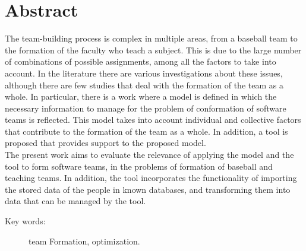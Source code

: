 
\section*{Abstract} 

The team-building process is complex in multiple areas, from a baseball team to the formation of the faculty who teach a subject. This is due to the large number of combinations of possible assignments, among all the factors to take into account. In the literature there are various investigations about these issues, although there are few studies that deal with the formation of the team as a whole. In particular, there is a work where a model is defined in which the necessary information to manage for the problem of conformation of software teams is reflected. This model takes into account individual and collective factors that contribute to the formation of the team as a whole. In addition, a tool is proposed that provides support to the proposed model. \\

The present work aims to evaluate the relevance of applying the model and the tool to form software teams, in the problems of formation of baseball and teaching teams. In addition, the tool incorporates the functionality of importing the stored data of the people in known databases, and transforming them into data that can be managed by the tool.

\begin{description}
	\item[Key words:]{team Formation, optimization.}
\end{description}